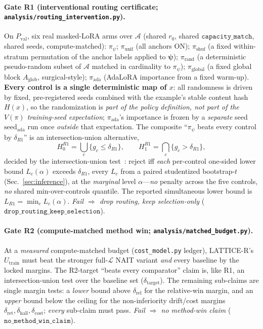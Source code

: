 \documentclass[11pt]{article}
\theoremstyle{definition}
\newcommand{\Aset}{\mathcal{A}}
\newcommand{\Lset}{\mathcal{L}}
\newcommand{\psivec}{\bm{\psi}}
\newcommand{\Utr}{U_{\mathrm{train}}}
\newcommand{\Vpol}{V}
\begin{document}
\paragraph{Gate R1 (interventional routing certificate; \texttt{analysis/routing\_intervention.py}).}
On $P_{\mathrm{val}}$, six real masked-LoRA arms over $\Aset$ (shared $r_0$, shared
$\texttt{capacity\_match}$, shared seeds, compute-matched): $\pi_\psi$; $\pi_{\mathrm{unif}}$
(all anchors ON); $\pi_{\mathrm{shuf}}$ (a fixed within-stratum permutation of the anchor
labels applied to $\psivec$); $\pi_{\mathrm{rand}}$ (a deterministic pseudo-random subset of
$\Aset$ matched in cardinality to $\pi_\psi$); $\pi_{\mathrm{global}}$ (a fixed global
block $A_{\mathrm{glob}}$, surgical-style); $\pi_{\mathrm{ada}}$ (AdaLoRA importance from a
fixed warm-up). \textbf{Every control is a single deterministic map of $x$}: all
randomness is driven by fixed, pre-registered seeds combined with the example's stable
content hash $H(x)$, so the randomization is \emph{part of the policy definition, not part
of the $\Vpol(\pi)$ training-seed expectation}; $\pi_{\mathrm{ada}}$'s importance is frozen
by a \emph{separate} seed $\mathrm{seed}_{\mathrm{ada}}$ run once \emph{outside} that
expectation. The composite ``$\pi_\psi$ beats every control by $\delta_{R1}$'' is an
intersection-union alternative,
\begin{equation}
H_0^{R1}=\bigcup_c\{g_c\le\delta_{R1}\},\qquad
H_1^{R1}=\bigcap_c\{g_c>\delta_{R1}\},
\label{eq:iutnull}
\end{equation}
decided by the intersection-union test~\cite{berger1982iut}: reject iff \emph{each}
per-control one-sided lower bound $L_c(\alpha)$ exceeds $\delta_{R1}$, every $L_c$ from a
paired studentized bootstrap-$t$ (Sec.~\ref{sec:inference}), at the \emph{marginal} level
$\alpha$---\emph{no} penalty across the five controls, \emph{no} shared min-over-controls
quantile. The reported simultaneous lower bound is $L_{R1}=\min_c L_c(\alpha)$. \emph{Fail
$\Rightarrow$ drop routing, keep selection-only} ($\texttt{drop\_routing\_keep\_selection}$).

\paragraph{Gate R2 (compute-matched method win; \texttt{analysis/matched\_budget.py}).}
At a \emph{measured} compute-matched budget (\texttt{cost\_model.py} ledger), LATTICE-R's
$\Utr$ must beat the stronger full-$\Lset$ NAIT variant \emph{and} every baseline by the
locked margins. The R2-target ``beats every comparator'' claim is, like R1, an
intersection-union test over the baseline set ($\delta_{\mathrm{target}}$). The remaining
sub-claims are single margin tests: a \emph{lower} bound above $\delta_{\mathrm{rel}}$ for
the relative-win margin, and an \emph{upper} bound below the ceiling for the
non-inferiority drift/cost margins $\delta_{\mathrm{ret}},\delta_{\mathrm{hall}},
\delta_{\mathrm{cost}}$; \emph{every} sub-claim must pass. \emph{Fail $\Rightarrow$ no
method-win claim} ($\texttt{no\_method\_win\_claim}$).
\end{document}
